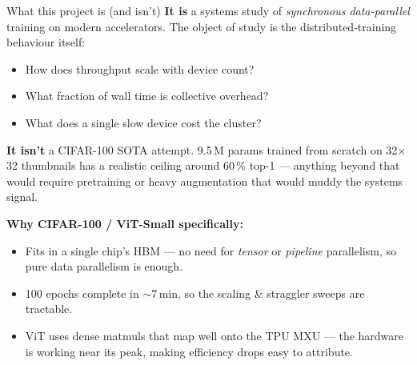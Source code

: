 \documentclass[aspectratio=169,10pt]{beamer}
\begin{document}
\begin{frame}{What this project is (and isn't)}
  \textbf{It is} a systems study of \emph{synchronous data-parallel} training on modern
  accelerators. The object of study is the distributed-training behaviour itself:
  \begin{itemize}
    \item How does throughput scale with device count?
    \item What fraction of wall time is collective overhead?
    \item What does a single slow device cost the cluster?
  \end{itemize}

  \textbf{It isn't} a CIFAR-100 SOTA attempt. 9.5\,M params trained from scratch on
  32$\times$32 thumbnails has a realistic ceiling around 60\,\% top-1 — anything beyond
  that would require pretraining or heavy augmentation that would muddy the systems signal.

  \vspace{0.6em}
  \textbf{Why CIFAR-100 / ViT-Small specifically:}
  \begin{itemize}
    \item Fits in a single chip's HBM — no need for \emph{tensor} or \emph{pipeline}
          parallelism, so pure data parallelism is enough.
    \item 100 epochs complete in $\sim$7\,min, so the scaling \& straggler sweeps are tractable.
    \item ViT uses dense matmuls that map well onto the TPU MXU — the hardware is working
          near its peak, making efficiency drops easy to attribute.
  \end{itemize}
\end{frame}
\end{document}
